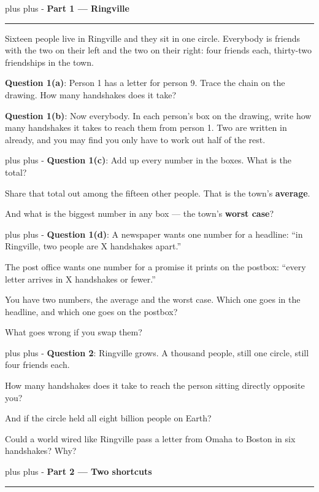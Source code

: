 \documentclass[a4paper, 14pt]{extarticle}
\newcommand{\needroom}[1]{%
  \par
  \begingroup
    \setlength{\dimen0}{#1}%
    \vskip 0pt plus \dimen0
    \penalty -100%
    \vskip 0pt plus -\dimen0
  \endgroup}
\newcommand{\parthead}[2]{%
  \needroom{6\baselineskip}%
  \partheadhere{#1}{#2}}
\newcommand{\partheadhere}[2]{%
  \vspace{0.5em}
  {\large\bfseries Part #1 --- #2}\par
  \vspace{-0.4em}\rule{\textwidth}{0.8pt}\par
  \vspace{0.1em}}
\begin{document}
\parthead{1}{Ringville}

Sixteen people live in Ringville and they sit in one circle. Everybody is
friends with the two on their left and the two on their right: four friends
each, thirty-two friendships in the town.

\vspace{-0.4em}
\begin{center}
\end{center}
\vspace{-0.5em}

{\bf Question 1(a)}: Person 1 has a letter for person 9. Trace the chain on the
drawing. How many handshakes does it take?

{\bf Question 1(b)}: Now everybody. In each person's box on the drawing, write
how many handshakes it takes to reach them from person 1. Two are written in
already, and you may find you only have to work out half of the rest.

\needroom{3\baselineskip}%
{\bf Question 1(c)}: Add up every number in the boxes. What is the total?

Share that total out among the fifteen other people. That is the town's
\textbf{average}.

And what is the biggest number in any box --- the town's \textbf{worst case}?

\needroom{4\baselineskip}%
{\bf Question 1(d)}: A newspaper wants one number for a headline: ``in
Ringville, two people are X handshakes apart.''

The post office wants one number for a promise it prints on the postbox:
``every letter arrives in X handshakes or fewer.''

You have two numbers, the average and the worst case. Which one goes in the
headline, and which one goes on the postbox?

What goes wrong if you swap them?

\needroom{3\baselineskip}%
{\bf Question 2}: Ringville grows. A thousand people, still one circle, still
four friends each.

How many handshakes does it take to reach the person sitting directly opposite
you?

And if the circle held all eight billion people on Earth?

Could a world wired like Ringville pass a letter from Omaha to Boston in six
handshakes? Why?

\parthead{2}{Two shortcuts}
\end{document}
